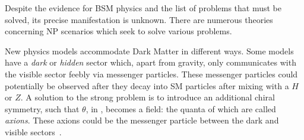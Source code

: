 
Despite the evidence for BSM physics and the list of problems that must be solved, its precise
manifestation is unknown.
There are numerous theories concerning NP scenarios which seek to solve various problems.

New physics models accommodate Dark Matter in different ways.
Some models have a \emph{dark} or \emph{hidden} sector which, apart from gravity, only
communicates with the visible sector feebly via messenger particles.
These messenger particles could potentially be observed after they decay into SM particles after
mixing with a $H$ or $Z$.
A solution to the strong \CP problem is to introduce an additional chiral symmetry, such that
$\theta$, in , becomes a field: the quanta of which are called \emph{axions}.
These axions could be the messenger particle between the dark and visible
sectors~\cite{Peccei:2006as}.


